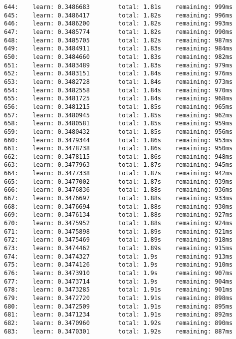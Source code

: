 \documentclass[11pt]{article}
\begin{document}
\begin{Verbatim}[commandchars=\\\{\}]
644:    learn: 0.3486683        total: 1.81s    remaining: 999ms
645:    learn: 0.3486417        total: 1.82s    remaining: 996ms
646:    learn: 0.3486200        total: 1.82s    remaining: 993ms
647:    learn: 0.3485774        total: 1.82s    remaining: 990ms
648:    learn: 0.3485705        total: 1.82s    remaining: 987ms
649:    learn: 0.3484911        total: 1.83s    remaining: 984ms
650:    learn: 0.3484660        total: 1.83s    remaining: 982ms
651:    learn: 0.3483489        total: 1.83s    remaining: 979ms
652:    learn: 0.3483151        total: 1.84s    remaining: 976ms
653:    learn: 0.3482728        total: 1.84s    remaining: 973ms
654:    learn: 0.3482558        total: 1.84s    remaining: 970ms
655:    learn: 0.3481725        total: 1.84s    remaining: 968ms
656:    learn: 0.3481215        total: 1.85s    remaining: 965ms
657:    learn: 0.3480945        total: 1.85s    remaining: 962ms
658:    learn: 0.3480581        total: 1.85s    remaining: 959ms
659:    learn: 0.3480432        total: 1.85s    remaining: 956ms
660:    learn: 0.3479344        total: 1.86s    remaining: 953ms
661:    learn: 0.3478738        total: 1.86s    remaining: 950ms
662:    learn: 0.3478115        total: 1.86s    remaining: 948ms
663:    learn: 0.3477963        total: 1.87s    remaining: 945ms
664:    learn: 0.3477338        total: 1.87s    remaining: 942ms
665:    learn: 0.3477002        total: 1.87s    remaining: 939ms
666:    learn: 0.3476836        total: 1.88s    remaining: 936ms
667:    learn: 0.3476697        total: 1.88s    remaining: 933ms
668:    learn: 0.3476694        total: 1.88s    remaining: 930ms
669:    learn: 0.3476134        total: 1.88s    remaining: 927ms
670:    learn: 0.3475952        total: 1.88s    remaining: 924ms
671:    learn: 0.3475898        total: 1.89s    remaining: 921ms
672:    learn: 0.3475469        total: 1.89s    remaining: 918ms
673:    learn: 0.3474462        total: 1.89s    remaining: 915ms
674:    learn: 0.3474327        total: 1.9s     remaining: 913ms
675:    learn: 0.3474126        total: 1.9s     remaining: 910ms
676:    learn: 0.3473910        total: 1.9s     remaining: 907ms
677:    learn: 0.3473714        total: 1.9s     remaining: 904ms
678:    learn: 0.3473285        total: 1.91s    remaining: 901ms
679:    learn: 0.3472720        total: 1.91s    remaining: 898ms
680:    learn: 0.3472509        total: 1.91s    remaining: 895ms
681:    learn: 0.3471234        total: 1.91s    remaining: 892ms
682:    learn: 0.3470960        total: 1.92s    remaining: 890ms
683:    learn: 0.3470301        total: 1.92s    remaining: 887ms

\end{Verbatim}
\end{document}
